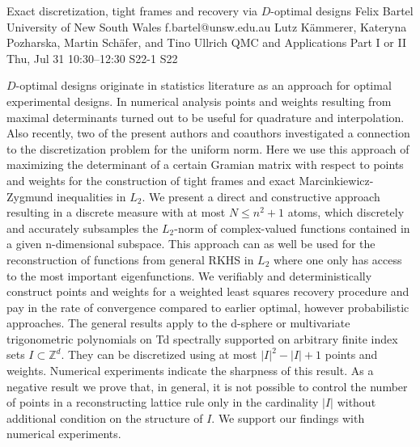\begin{talk}
  {Exact discretization, tight frames and recovery via $D$-optimal designs}%
  {Felix Bartel}%
  {University of New South Wales}%
  {f.bartel@unsw.edu.au}%
  {Lutz Kämmerer, Kateryna Pozharska, Martin Schäfer, and Tino Ullrich}%
  {QMC and Applications Part I or II}%
  {Thu, Jul 31 10:30–12:30}%
  {S22-1}%
  {S22}%
				
			
    $D$-optimal designs originate in statistics literature as an approach for optimal experimental designs. In numerical analysis points and weights resulting from maximal determinants turned out to be useful for quadrature and interpolation. Also recently, two of the present authors and coauthors investigated a connection to the discretization problem for the uniform norm. Here we use this approach of maximizing the determinant of a certain Gramian matrix with respect to points and weights for the construction of tight frames and exact Marcinkiewicz-Zygmund inequalities in $L_2$. We present a direct and constructive approach resulting in a discrete measure with at most $N\le n^2+1$ atoms, which discretely and accurately subsamples the $L_2$-norm of complex-valued functions contained in a given n-dimensional subspace. This approach can as well be used for the reconstruction of functions from general RKHS in $L_2$ where one only has access to the most important eigenfunctions. We verifiably and deterministically construct points and weights for a weighted least squares recovery procedure and pay in the rate of convergence compared to earlier optimal, however probabilistic approaches. The general results apply to the d-sphere or multivariate trigonometric polynomials on Td spectrally supported on arbitrary finite index sets $I\subset\mathbb Z^d$. They can be discretized using at most $|I|^2-|I|+1$ points and weights. Numerical experiments indicate the sharpness of this result. As a negative result we prove that, in general, it is not possible to control the number of points in a reconstructing lattice rule only in the cardinality $|I|$ without additional condition on the structure of $I$. We support our findings with numerical experiments.

\medskip

\end{talk}

